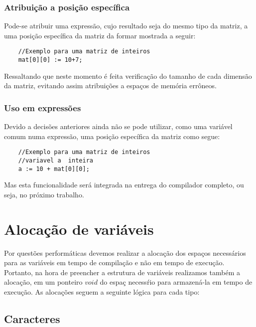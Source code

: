\documentclass[a4paper,12pt]{report}
\begin{document}
\subsubsection{Atribui\c{c}\~ao a posi\c{c}\~ao espec\'ifica}

Pode-se atribuir uma express\~ao, cujo resultado seja do mesmo tipo da matriz, a uma posi\c{c}\~ao espec\'ifica da matriz da formar mostrada a seguir:

\begin{verbatim}
	//Exemplo para uma matriz de inteiros
	mat[0][0] := 10+7;
\end{verbatim}

Ressaltando que neste momento \'e feita verifica\c{c}\~ao do tamanho de cada dimens\~ao da
matriz, evitando assim atribui\c{c}\~oes a espa\c{c}os de mem\'oria err\^oneos.

\subsubsection{Uso em express\~oes}

Devido a decis\~oes anteriores ainda n\~ao se pode
utilizar, como uma vari\'avel comum numa express\~ao, uma posi\c{c}\~ao espec\'ifica 
da matriz como segue:

\begin{verbatim}
	//Exemplo para uma matriz de inteiros
    //variavel a  inteira
	a := 10 + mat[0][0];
\end{verbatim}

Mas esta funcionalidade ser\'a integrada na entrega do compilador completo, ou seja, no pr\'oximo trabalho.

\section{Aloca\c{c}\~ao de vari\'aveis}

Por quest\~oes perform\'aticas devemos realizar a aloca\c{c}\~ao dos espa\c{c}os necess\'arios  
para as vari\'aveis em tempo de compila\c{c}\~ao e n\~ao em tempo de execu\c{c}\~ao. Portanto, na
hora de preencher a estrutura de vari\'aveis realizamos tamb\'em a aloca\c{c}\~ao, em um ponteiro
$void$ do espa\c{c} necess\'rio para armazen\'a-la em tempo de execu\c{c}\~ao. As aloca\c{c}\~oes 
seguem a seguinte l\'ogica para cada tipo:

\subsection{Caracteres}
\end{document}
